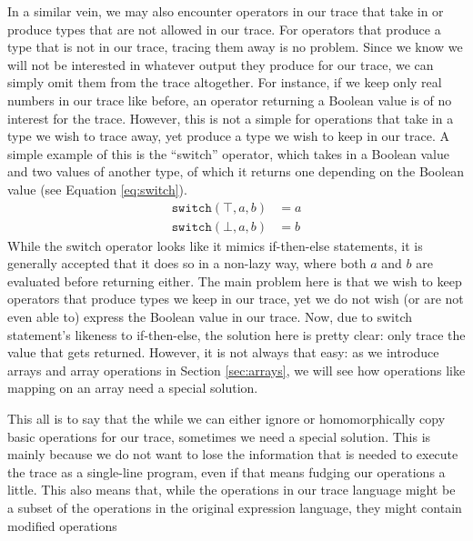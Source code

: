     In a similar vein, we may also encounter operators in our trace that take in or produce types that are not allowed in our trace.
    For operators that produce a type that is not in our trace, tracing them away is no problem.
    Since we know we will not be interested in whatever output they produce for our trace, we can simply omit them from the trace altogether.
    For instance, if we keep only real numbers in our trace like before, an operator returning a Boolean value is of no interest for the trace.
    However, this is not a simple for operations that take in a type we wish to trace away, yet produce a type we wish to keep in our trace.
    A simple example of this is the ``switch'' operator, which takes in a Boolean value and two values of another type, of which it returns one depending on the Boolean value (see Equation \ref{eq:switch}).
    \begin{equation}
        \begin{aligned}
            \texttt{switch}(\top,a,b)&=a\\
            \texttt{switch}(\bot,a,b)&=b
        \end{aligned}
        \label{eq:switch}
    \end{equation}
    While the switch operator looks like it mimics if-then-else statements, it is generally accepted that it does so in a non-lazy way, where both $a$ and $b$ are evaluated before returning either.
    The main problem here is that we wish to keep operators that produce types we keep in our trace, yet we do not wish (or are not even able to) express the Boolean value in our trace.
    Now, due to switch statement's likeness to if-then-else, the solution here is pretty clear: only trace the value that gets returned.
    However, it is not always that easy: as we introduce arrays and array operations in Section \ref{sec:arrays}, we will see how operations like mapping on an array need a special solution.
    
    This all is to say that the while we can either ignore or homomorphically copy basic operations for our trace, sometimes we need a special solution.
    This is mainly because we do not want to lose the information that is needed to execute the trace as a single-line program, even if that means fudging our operations a little.
    This also means that, while the operations in our trace language might be a subset of the operations in the original expression language, they might contain modified operations

